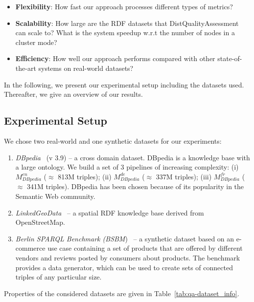 \begin{itemize}
    \item \textbf{Flexibility}: How fast our approach processes different types of metrics?
    \item \textbf{Scalability}: How large are the \gls{RDF} datasets that DistQualityAssessment can scale to? 
    What is the system speedup w.r.t the number of nodes in a cluster mode?
    \item \textbf{Efficiency}: How well our approach performs compared with other state-of-the-art systems on real-world datasets?
\end{itemize}
In the following, we present our experimental setup including the datasets used. 
Thereafter, we give an overview of our results.

\subsection{Experimental Setup}
We chose two real-world and one synthetic datasets for our experiments:
 \begin{enumerate}
 \item \emph{DBpedia}~\cite{dbpedia-swj} (v 3.9) -- a cross domain dataset.
 DBpedia is a knowledge base with a large ontology.
 We build a set of 3 pipelines of increasing complexity: (i) $M_{DBpedia}^{en}$ ($\approx$ 813M triples); (ii) $M_{DBpedia}^{de}$ ($\approx$ 337M triples); (iii) $M_{DBpedia}^{fr}$ ($\approx$ 341M triples). 
DBpedia has been chosen because of its popularity in the Semantic Web community.
\item \emph{LinkedGeoData}~\cite{SLHA11} -- a spatial \gls{RDF} knowledge base derived from OpenStreetMap.
\item \emph{Berlin \gls{SPARQL} Benchmark (BSBM})~\cite{Bizer2009TheBS}  -- a synthetic dataset based on an e-commerce use case containing a set of products that are offered by different vendors and reviews posted by consumers about products.
The benchmark provides a data generator, which can be used to create sets of connected triples of any particular size.
 \end{enumerate}
Properties of the considered datasets are given in Table~\ref{tab:qa-dataset_info}.

